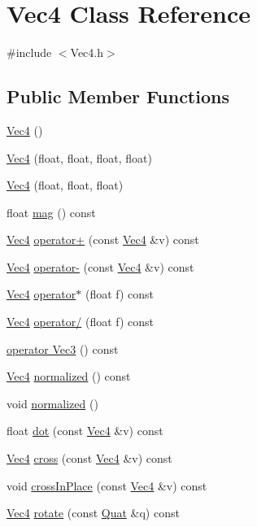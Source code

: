 \hypertarget{class_vec4}{}\section{Vec4 Class Reference}
\label{class_vec4}


{\ttfamily \#include $<$Vec4.\+h$>$}

\subsection*{Public Member Functions}
\begin{DoxyCompactItemize}
\item 
\hyperlink{class_vec4_a55a46de1fc067fd2d696ea5be485ce3c}{Vec4} ()
\item 
\hyperlink{class_vec4_a32ed55e34ba4ee415cd1a5dd3cb2b6a6}{Vec4} (float, float, float, float)
\item 
\hyperlink{class_vec4_ada7dd988156a97dac4254785bcf3cf5f}{Vec4} (float, float, float)
\item 
float \hyperlink{class_vec4_afb6c284999974dcc8bd234ee9fd56741}{mag} () const 
\item 
\hyperlink{class_vec4}{Vec4} \hyperlink{class_vec4_a86a962f2694e001c1f6a716c81ba8887}{operator+} (const \hyperlink{class_vec4}{Vec4} \&v) const 
\item 
\hyperlink{class_vec4}{Vec4} \hyperlink{class_vec4_a5ab7d37b0b2be416599357dd08d1e5b5}{operator-\/} (const \hyperlink{class_vec4}{Vec4} \&v) const 
\item 
\hyperlink{class_vec4}{Vec4} \hyperlink{class_vec4_ab126a9b6405f810c41556747a12becc0}{operator$\ast$} (float f) const 
\item 
\hyperlink{class_vec4}{Vec4} \hyperlink{class_vec4_a2d111db713a5d43f486b64cce3d4e44d}{operator/} (float f) const 
\item 
\hyperlink{class_vec4_a6b97a2b8174cfe1705615efe5f1b87a3}{operator Vec3} () const 
\item 
\hyperlink{class_vec4}{Vec4} \hyperlink{class_vec4_a84ed396a034afd69c1d99ad544919697}{normalized} () const 
\item 
void \hyperlink{class_vec4_ad6e92a75b8889d956159540fc294da26}{normalized} ()
\item 
float \hyperlink{class_vec4_a5cf588ba5acf013d55a3fffa434f4911}{dot} (const \hyperlink{class_vec4}{Vec4} \&v) const 
\item 
\hyperlink{class_vec4}{Vec4} \hyperlink{class_vec4_ac01b49eeadc169bdefc238918c3a7d4b}{cross} (const \hyperlink{class_vec4}{Vec4} \&v) const 
\item 
void \hyperlink{class_vec4_af256f4393b1d94cc6343cf06f1caddf1}{cross\+In\+Place} (const \hyperlink{class_vec4}{Vec4} \&v) const 
\item 
\hyperlink{class_vec4}{Vec4} \hyperlink{class_vec4_aa2e7a8788b446e5c738ce7514732a01b}{rotate} (const \hyperlink{class_quat}{Quat} \&q) const 
\end{DoxyCompactItemize}
